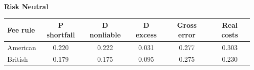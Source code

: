 \documentclass[10pt,border=5pt,varwidth=17cm]{standalone}
\begin{document}
\begingroup
\small
\setlength{\tabcolsep}{5pt}
\renewcommand{\arraystretch}{1.20}
\noindent\textbf{Risk Neutral}\par\smallskip
\noindent\begin{tabularx}{\linewidth}{@{}>{\raggedright\arraybackslash}Xccccc@{}}
\toprule
\textbf{Fee rule} & \textbf{P shortfall} & \textbf{D nonliable} & \textbf{D excess} & \textbf{Gross error} & \textbf{Real costs} \\
\midrule
American & 0.220 & 0.222 & 0.031 & 0.277 & 0.303 \\
British & 0.179 & 0.175 & 0.095 & 0.275 & 0.230 \\
\bottomrule\end{tabularx}\par\medskip
\endgroup
\end{document}
